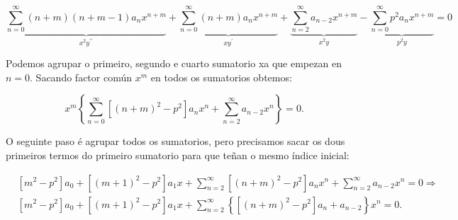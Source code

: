 \documentclass[a4paper,12pt,titlepage]{article}
\begin{document}
$$
\underbrace{\sum_{n=0}^{\infty}(n+m)(n+m-1) a_{n} x^{n+m}}_{x^{2} y^{\prime \prime}}+\underbrace{\sum_{n=0}^{\infty}(n+m) a_{n} x^{n+m}}_{x y^{\prime}}+\underbrace{\sum_{n=2}^{\infty} a_{n-2} x^{n+m}}_{x^{2} y}-\underbrace{\sum_{n=0}^{\infty} p^{2} a_{n} x^{n+m}}_{p^{2} y}=0
$$

Podemos agrupar o primeiro, segundo e cuarto sumatorio xa que empezan en $n=0$. Sacando factor común $x^m$ en todos os sumatorios obtemos:

$$
x^{m}\left\{\sum_{n=0}^{\infty}\left[(n+m)^{2}-p^{2}\right] a_{n} x^{n}+\sum_{n=2}^{\infty} a_{n-2} x^{n}\right\}=0 .
$$

O seguinte paso é agrupar todos os sumatorios, pero precisamos sacar os dous primeiros termos do primeiro sumatorio para que teñan o mesmo índice inicial:

$$
\begin{aligned}
& {\left[m^{2}-p^{2}\right] a_{0}+\left[(m+1)^{2}-p^{2}\right] a_{1} x+\sum_{n=2}^{\infty}\left[(n+m)^{2}-p^{2}\right] a_{n} x^{n}+\sum_{n=2}^{\infty} a_{n-2} x^{n}=0 \Rightarrow} \\
& {\left[m^{2}-p^{2}\right] a_{0}+\left[(m+1)^{2}-p^{2}\right] a_{1} x+\sum_{n=2}^{\infty}\left\{\left[(n+m)^{2}-p^{2}\right] a_{n}+a_{n-2}\right\} x^{n}=0 .}
\end{aligned}
$$
\end{document}
